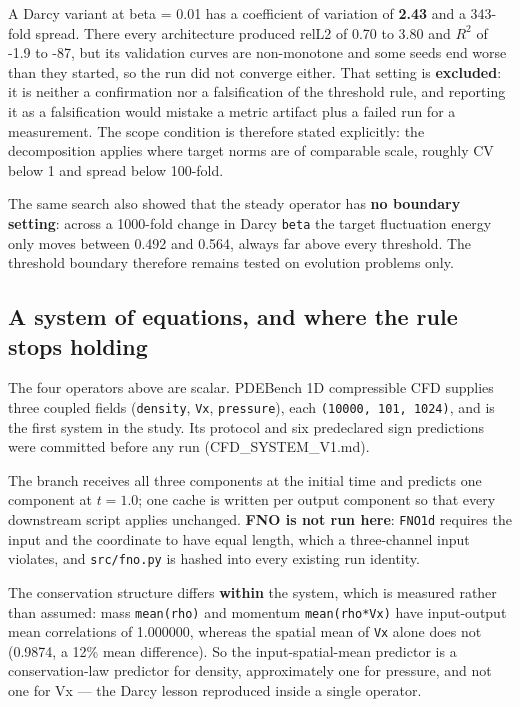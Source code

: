 \documentclass[preprint,12pt]{elsarticle}
\begin{document}
A Darcy variant at beta = 0.01 has a coefficient of variation of \textbf{2.43} and a 343-fold spread. There every architecture produced relL2 of 0.70 to 3.80 and $R^2$ of -1.9 to -87, but its validation curves are non-monotone and some seeds end worse than they started, so the run did not converge either. That setting is \textbf{excluded}: it is neither a confirmation nor a falsification of the threshold rule, and reporting it as a falsification would mistake a metric artifact plus a failed run for a measurement. The scope condition is therefore stated explicitly: the decomposition applies where target norms are of comparable scale, roughly CV below 1 and spread below 100-fold.

The same search also showed that the steady operator has \textbf{no boundary setting}: across a 1000-fold change in Darcy \texttt{beta} the target fluctuation energy only moves between 0.492 and 0.564, always far above every threshold. The threshold boundary therefore remains tested on evolution problems only.

\subsection{A system of equations, and where the rule stops holding}

The four operators above are scalar. PDEBench 1D compressible CFD supplies three coupled fields (\texttt{density}, \texttt{Vx}, \texttt{pressure}), each \texttt{(10000, 101, 1024)}, and is the first system in the study. Its protocol and six predeclared sign predictions were committed before any run (CFD\_SYSTEM\_V1.md).

The branch receives all three components at the initial time and predicts one component at $t = 1.0$; one cache is written per output component so that every downstream script applies unchanged. \textbf{FNO is not run here}: \texttt{FNO1d} requires the input and the coordinate to have equal length, which a three-channel input violates, and \texttt{src/fno.py} is hashed into every existing run identity.

The conservation structure differs \textbf{within} the system, which is measured rather than assumed: mass \texttt{mean(rho)} and momentum \texttt{mean(rho*Vx)} have input-output mean correlations of 1.000000, whereas the spatial mean of \texttt{Vx} alone does not (0.9874, a 12\% mean difference). So the input-spatial-mean predictor is a conservation-law predictor for density, approximately one for pressure, and not one for Vx --- the Darcy lesson reproduced inside a single operator.
\end{document}
